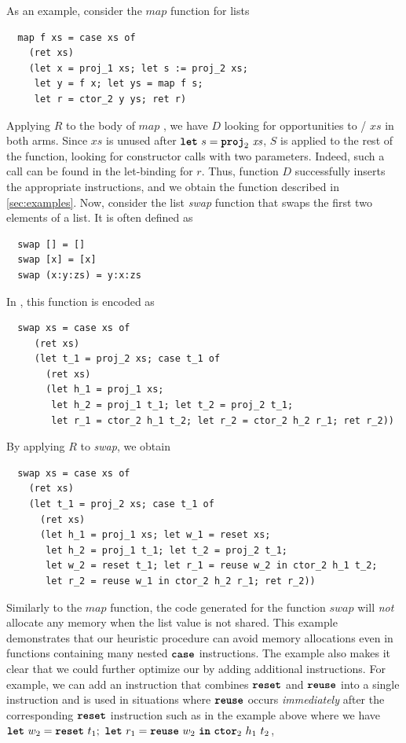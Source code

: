 As an example, consider the $\textit{map}$ function for lists
\begin{lstlisting}
  map f xs = case xs of
    (ret xs)
    (let x = proj_1 xs; let s := proj_2 xs;
     let y = f x; let ys = map f s;
     let r = ctor_2 y ys; ret r)
\end{lstlisting}
Applying $R$ to the body of $\textit{map}$ , we have $D$ looking for opportunities to / $\textit{xs}$
in both  arms.
Since $\textit{xs}$ is unused after $\kw{let}\ s = \kw{proj}_2\ \textit{xs}$, $S$ is applied to the rest of the function,
looking for constructor calls with two parameters. Indeed, such a call can be found in the let-binding for $r$. Thus,
function $D$ successfully inserts the appropriate instructions, and we obtain the function described in \cref{sec:examples}.
Now, consider the list \emph{swap} function that swaps the first two elements of a list.
It is often defined as
\begin{lstlisting}
  swap [] = []
  swap [x] = [x]
  swap (x:y:zs) = y:x:zs
\end{lstlisting}
In \pureIR{}, this function is encoded as
\begin{lstlisting}
  swap xs = case xs of
     (ret xs)
     (let t_1 = proj_2 xs; case t_1 of
       (ret xs)
       (let h_1 = proj_1 xs;
        let h_2 = proj_1 t_1; let t_2 = proj_2 t_1;
        let r_1 = ctor_2 h_1 t_2; let r_2 = ctor_2 h_2 r_1; ret r_2))
\end{lstlisting}
By applying $R$ to \emph{swap}, we obtain
\pagebreak
\begin{lstlisting}
  swap xs = case xs of
    (ret xs)
    (let t_1 = proj_2 xs; case t_1 of
      (ret xs)
      (let h_1 = proj_1 xs; let w_1 = reset xs;
       let h_2 = proj_1 t_1; let t_2 = proj_2 t_1;
       let w_2 = reset t_1; let r_1 = reuse w_2 in ctor_2 h_1 t_2;
       let r_2 = reuse w_1 in ctor_2 h_2 r_1; ret r_2))
\end{lstlisting}
Similarly to the $\textit{map}$ function, the code generated for the
function $\textit{swap}$ will \emph{not} allocate any memory when the
list value is not shared. This example demonstrates that our heuristic
procedure can avoid memory allocations even in functions containing
many nested $\texttt{\textbf{case}}$ instructions. The example also makes it clear
that we could further optimize our \rcIR{} by adding additional
instructions. For example, we can
add an instruction that combines $\texttt{\textbf{reset}}$ and $\texttt{\textbf{reuse}}$ into a single instruction
and is used in situations where $\texttt{\textbf{reuse}}$ occurs \emph{immediately}
after the corresponding $\texttt{\textbf{reset}}$ instruction such as in the example above where we have
$\kw{let}\ w_2 = \kw{reset}\ t_1;\ \kw{let}\ r_1 =\kw{reuse}\ w_2\ \kw{in}\ \kw{ctor}_2\ h_1\ t_2$,

